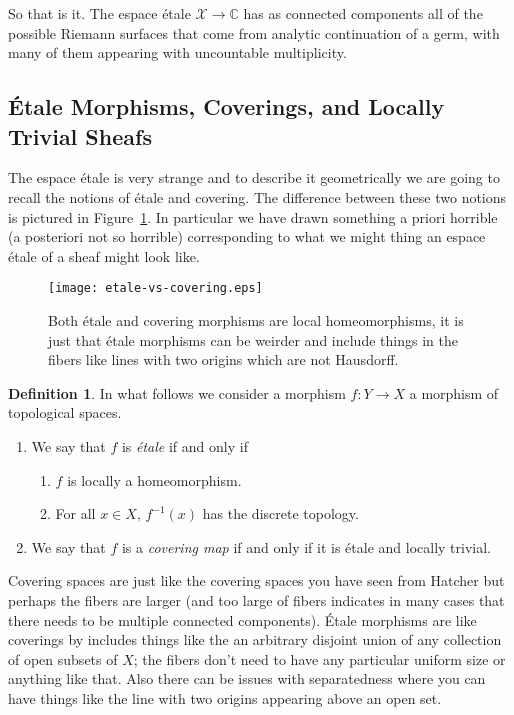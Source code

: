 \documentclass[12pt]{book}
\numberwithin{equation}{section}
\theoremstyle{definition}
\newtheorem{definition}[theorem]{Definition}
\theoremstyle{remark}
\newcommand{\CC}{\mathbb{C}}
\begin{document}
So that is it. The espace \'etale $\mathcal{X} \to \CC$ has as connected components all of the possible Riemann surfaces that come from analytic continuation of a germ, with many of them appearing with uncountable multiplicity.


\subsection{\'Etale Morphisms, Coverings, and Locally Trivial Sheafs}
The espace \'etale is very strange and to describe it geometrically we are going to recall the notions of \'etale and covering. 
The difference between these two notions is pictured in Figure~\ref{F:etale-vs-covering}.
In particular we have drawn something a priori horrible (a posteriori not so horrible) corresponding to what we might thing an espace \'etale of a sheaf might look like.
\begin{figure}[h]
	\begin{center}
		\texttt{[image: etale-vs-covering.eps]}
	\end{center}
	\caption{Both \'etale and covering morphisms are local homeomorphisms, it is just that \'etale morphisms can be weirder and include things in the fibers like lines with two origins which are not Hausdorff.}\label{F:etale-vs-covering}
\end{figure}

\begin{definition}
	In what follows we consider a morphism $f: Y\to X$ a morphism of topological spaces. 
	\begin{enumerate}
		\item We say that $f$ is \emph{\'etale} if and only if 
		\begin{enumerate}
			\item $f$ is locally a homeomorphism.
			\item For all $x\in X$, $f^{-1}(x)$ has the discrete topology. 
		\end{enumerate}
		\item We say that $f$ is a \emph{covering map} if and only if it is \'etale and locally trivial. 
	\end{enumerate}
\end{definition}
Covering spaces are just like the covering spaces you have seen from Hatcher but perhaps the fibers are larger (and too large of fibers indicates in many cases that there needs to be multiple connected components). 
\'{E}tale morphisms are like coverings by includes things like the an arbitrary disjoint union of any collection of open subsets of $X$; the fibers don't need to have any particular uniform size or anything like that. 
Also there can be issues with separatedness where you can have things like the line with two origins appearing above an open set.
\end{document}
